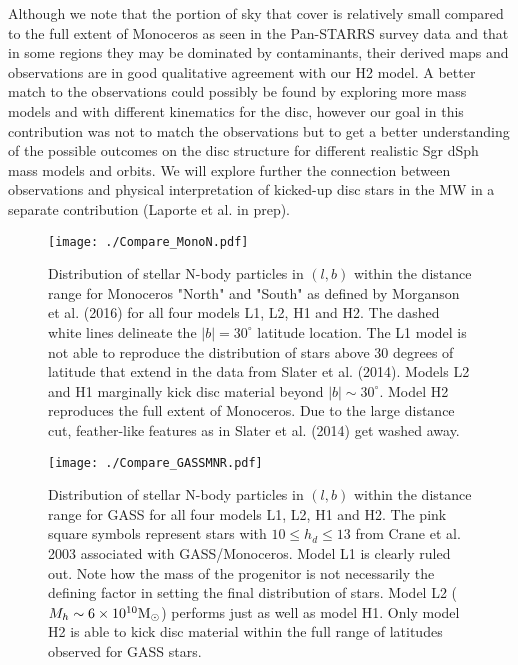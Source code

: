 \documentclass[useAMS,usenatbib]{mnras}
\begin{document}
Although we note that the portion of sky that \cite{deboer17} cover is relatively small compared to the full extent of Monoceros as seen in the Pan-STARRS survey data \citep{slater14} and that in some regions they may be dominated by contaminants, their derived maps and observations are in good qualitative agreement with our H2 model. A better match to the observations could possibly be found by exploring more mass models and with different kinematics for the disc, however our goal in this contribution was not to match the observations but to get a better understanding of the possible outcomes on the disc structure for different realistic Sgr dSph mass models and orbits. We will explore further the connection between observations and physical interpretation of kicked-up disc stars in the MW in a separate contribution (Laporte et al. in prep).%

\begin{figure}
\texttt{[image: ./Compare\_MonoN.pdf]}
\caption[]{Distribution of stellar N-body particles in $(l,b)$ within the distance range for Monoceros "North" and "South" as defined by Morganson et al. (2016) for all four models L1, L2, H1 and H2. The dashed white lines delineate the $|b|=30^{\circ}$ latitude location. The L1 model is not able to reproduce the distribution of stars above 30 degrees of latitude that extend in the data from Slater et al. (2014). Models L2 and H1 marginally kick disc material beyond $|b|\sim30^{\circ}$. Model H2 reproduces the full extent of Monoceros. Due to the large distance cut, feather-like features as in Slater et al. (2014) get washed away.}
\end{figure}

\begin{figure}
\texttt{[image: ./Compare\_GASSMNR.pdf]}
\caption[]{Distribution of stellar N-body particles in $(l,b)$ within the distance range for GASS for all four models L1, L2, H1 and H2. The pink square symbols represent stars with $10\leq h_{d} \leq13$ from Crane et al. 2003 associated with GASS/Monoceros.  Model L1 is clearly ruled out. Note how the mass of the progenitor is not necessarily the defining factor in setting the final distribution of stars. Model L2 ($M_{h}\sim6\times10^{10} \rm{M_{\odot}}$) performs just as well as model H1. Only model H2 is able to kick disc material within the full range of latitudes observed for GASS stars.}
\end{figure}
\end{document}
